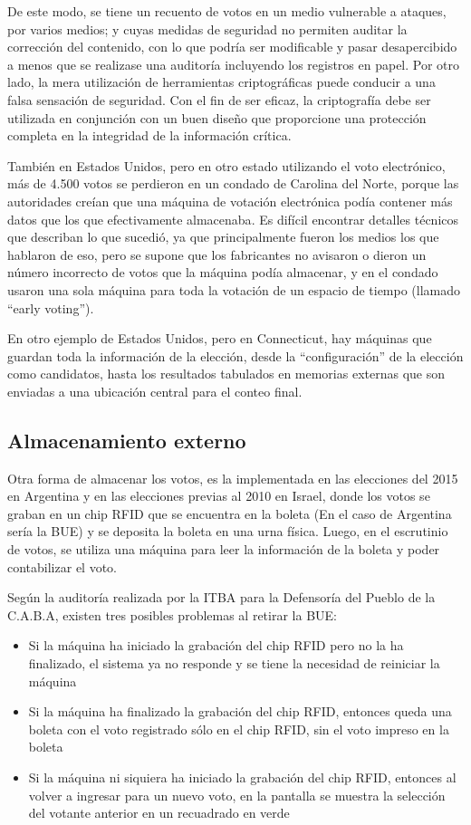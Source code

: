 De este modo, se tiene un recuento de votos en un medio vulnerable a ataques, por varios medios; y cuyas medidas de seguridad no permiten auditar la corrección del contenido, con lo que podría ser modificable y pasar desapercibido a menos que se realizase una auditoría incluyendo los registros en papel. Por otro lado, la mera utilización de herramientas criptográficas puede conducir a una falsa sensación de seguridad. Con el fin de ser eficaz, la criptografía debe ser utilizada en conjunción con un buen diseño que proporcione una protección completa en la integridad de la información crítica.

También en Estados Unidos, pero en otro estado utilizando el voto electrónico, más de 4.500 votos se perdieron en un condado de Carolina del Norte, porque las autoridades creían que una máquina de votación electrónica podía contener más datos que los que efectivamente almacenaba\cite{usatoday}. Es difícil encontrar detalles técnicos que describan lo que sucedió, ya que principalmente fueron los medios los que hablaron de eso, pero se supone que los fabricantes no avisaron o dieron un número incorrecto de votos que la máquina podía almacenar, y en el condado usaron una sola máquina para toda la votación de un espacio de tiempo (llamado ``early voting'').

En otro ejemplo de Estados Unidos, pero en Connecticut, hay máquinas que guardan toda la información de la elección, desde la ``configuración'' de la elección como candidatos, hasta los resultados tabulados en memorias externas que son enviadas a una ubicación central para el conteo final\cite{davtyan:2007}.

\subsection{Almacenamiento externo}

Otra forma de almacenar los votos, es la implementada en las elecciones del 2015 en Argentina y en las elecciones previas al 2010 en Israel, donde los votos se graban en un chip RFID que se encuentra en la boleta (En el caso de Argentina sería la BUE) y se deposita la boleta en una urna física. Luego, en el escrutinio de votos, se utiliza una máquina para leer la información de la boleta y poder contabilizar el voto.

Según la auditoría realizada por la ITBA para la Defensoría del Pueblo de la C.A.B.A\cite{itba}, existen tres posibles problemas al retirar la BUE:
\begin{itemize}
	\item Si la máquina ha iniciado la grabación del chip RFID pero no la ha finalizado, el sistema ya no responde y se tiene la necesidad de reiniciar la máquina
	\item Si la máquina ha finalizado la grabación del chip RFID, entonces queda una boleta con el voto registrado sólo en el chip RFID, sin el voto impreso en la boleta
	\item Si la máquina ni siquiera ha iniciado la grabación del chip RFID, entonces al volver a ingresar para un nuevo voto, en la pantalla se muestra la selección del votante anterior en un recuadrado en verde
\end{itemize}


